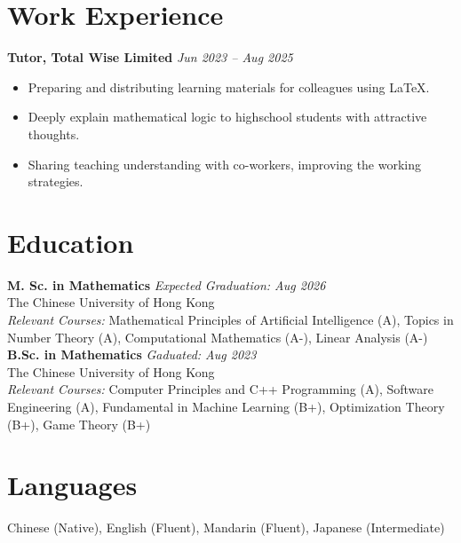 \documentclass[a4paper,10pt]{article}
\begin{document}
\section*{Work Experience}
\textbf{Tutor, Total Wise Limited} \hfill \textit{Jun 2023 -- Aug 2025} \\
\begin{itemize}[leftmargin=*]
  \item Preparing and distributing learning materials for colleagues using LaTeX.
  \item Deeply explain mathematical logic to highschool students with attractive thoughts.
  \item Sharing teaching understanding with co-workers, improving the working strategies.
\end{itemize}

\section*{Education}
\textbf{M. Sc. in Mathematics} \hfill \textit{Expected Graduation: Aug 2026} \\
The Chinese University of Hong Kong \\
\textit{Relevant Courses:} Mathematical Principles of Artificial Intelligence (A), Topics in Number Theory (A), Computational Mathematics (A-), Linear Analysis (A-)\\

\noindent\textbf{B.Sc. in Mathematics} \hfill \textit{Gaduated: Aug 2023} \\
The Chinese University of Hong Kong \\
\textit{Relevant Courses:} Computer Principles and C++ Programming (A), Software Engineering (A), Fundamental in Machine Learning (B+), Optimization Theory (B+), Game Theory (B+)

\section*{Languages}
Chinese (Native), English (Fluent), Mandarin (Fluent), Japanese (Intermediate)
\end{document}
